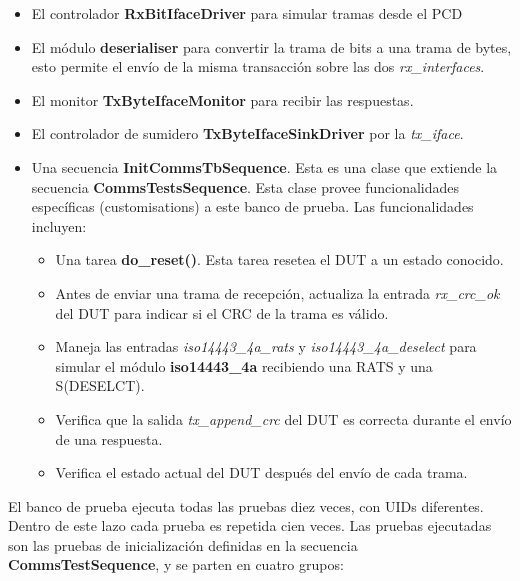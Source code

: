 \documentclass[a4paper, twoside, 11pt]{report}
\begin{document}
\begin{itemize}
  \item El controlador \textbf{RxBitIfaceDriver} para simular tramas desde el PCD
  \item El módulo \textbf{deserialiser} para convertir la trama de bits a una trama de bytes, esto permite el envío de la misma transacción sobre las dos \textit{rx\_interfaces}.
  \item El monitor \textbf{TxByteIfaceMonitor} para recibir las respuestas.
  \item El controlador de sumidero \textbf{TxByteIfaceSinkDriver} por la \textit{tx\_iface}.
  \item Una secuencia \textbf{InitCommsTbSequence}. Esta es una clase que extiende la secuencia \textbf{CommsTestsSequence}. Esta clase provee funcionalidades específicas (customisations) a este banco de prueba. Las funcionalidades incluyen:
  \begin{itemize}[label=$\circ$]
    \item Una tarea \textbf{do\_reset()}. Esta tarea resetea el DUT a un estado conocido.
    \item Antes de enviar una trama de recepción, actualiza la entrada \textit{rx\_crc\_ok} del DUT para indicar si el CRC de la trama es válido.
    \item Maneja las entradas \textit{iso14443\_4a\_rats} y \textit{iso14443\_4a\_deselect} para simular el módulo \textbf{iso14443\_4a} recibiendo una RATS y una S(DESELCT).
    \item Verifica que la salida \textit{tx\_append\_crc} del DUT es correcta durante el envío de una respuesta.
    \item Verifica el estado actual del DUT después del envío de cada trama.
  \end{itemize}
\end{itemize}

El banco de prueba ejecuta todas las pruebas diez veces, con UIDs diferentes. Dentro de este lazo cada prueba es repetida cien veces. Las pruebas ejecutadas son las pruebas de inicialización definidas en la secuencia \textbf{CommsTestSequence}, y se parten en cuatro grupos:
\end{document}
